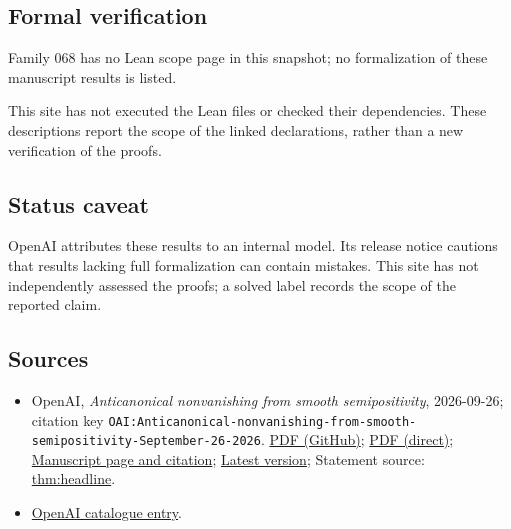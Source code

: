 \documentclass[11pt]{article}
\begin{document}
\subsection{Formal verification}
Family 068 has no Lean scope page in this snapshot; no formalization of these manuscript results is listed.

This site has not executed the Lean files or checked their dependencies. These descriptions report the scope of the linked declarations, rather than a new verification of the proofs.

\subsection{Status caveat}
OpenAI attributes these results to an internal model. Its release notice cautions that results lacking full formalization can contain mistakes. This site has not independently assessed the proofs; a solved label records the scope of the reported claim.

\subsection{Sources}
\begin{itemize}
\item OpenAI, \emph{Anticanonical nonvanishing from smooth semipositivity}, 2026-09-26; citation key \texttt{OAI:Anticanonical-nonvanishing-from-smooth-semipositivity-September-26-2026}. \href{https://github.com/openai/math/blob/adc7f1241b42e322a6451854ab7e4b4c146bf78a/preprints/Anticanonical-nonvanishing-from-smooth-semipositivity-September-26-2026/main.pdf}{PDF (GitHub)}; \href{https://github.com/openai/math/raw/adc7f1241b42e322a6451854ab7e4b4c146bf78a/preprints/Anticanonical-nonvanishing-from-smooth-semipositivity-September-26-2026/main.pdf}{PDF (direct)}; \href{https://github.com/openai/math/blob/adc7f1241b42e322a6451854ab7e4b4c146bf78a/preprints/Anticanonical-nonvanishing-from-smooth-semipositivity-September-26-2026/README.md}{Manuscript page and citation}; \href{https://github.com/openai/math/blob/main/preprints/Anticanonical-nonvanishing-from-smooth-semipositivity-September-26-2026/main.pdf}{Latest version}; Statement source: \href{https://github.com/openai/math/blob/adc7f1241b42e322a6451854ab7e4b4c146bf78a/preprints/Anticanonical-nonvanishing-from-smooth-semipositivity-September-26-2026/build/source/sections/introduction.tex\#L14}{thm:headline}.
\item \href{https://github.com/openai/math/blob/adc7f1241b42e322a6451854ab7e4b4c146bf78a/CONTENTS.md}{OpenAI catalogue entry}.
\end{itemize}
\end{document}
